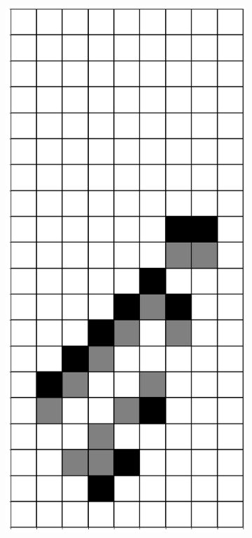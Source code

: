 \documentclass[12pt]{article}
\numberwithin{figure}{section} %
\begin{document}
\begin{figure}[H]
\begin{subfigure}{0.3\textwidth}
     		\subcaption{}
   	\end{subfigure}
     	\begin{subfigure}{0.3\textwidth}
     		\centering
     		\includegraphics[angle=270,width=\linewidth]{Section4/22.1}

\end{subfigure}
\end{figure}
\end{document}
